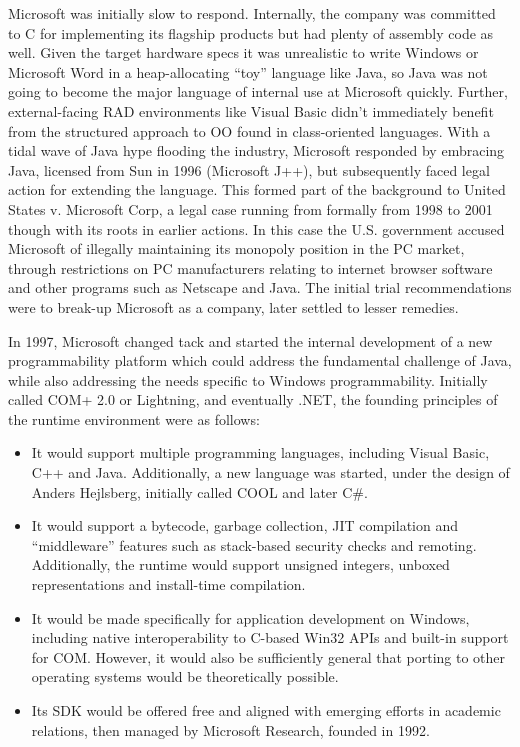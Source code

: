 \documentclass[acmsmall]{acmart}\settopmatter{}
\begin{document}
Microsoft was initially slow to respond.  Internally, the company was committed to C for implementing its
flagship products but had plenty of assembly code as well. Given the target hardware specs it was unrealistic to write
Windows or Microsoft Word in a heap-allocating “toy” language like Java, so Java was not going to become the major
language of internal use at Microsoft quickly. Further, external-facing RAD environments like Visual Basic didn’t immediately
benefit from the structured approach to OO found in class-oriented languages. With a tidal wave of Java hype flooding
the industry, Microsoft responded by embracing Java, licensed from Sun in 1996 (Microsoft J++), but subsequently faced
legal action for extending the language. This formed part of the background to United States v. Microsoft Corp, a legal case
running from formally from 1998 to 2001 though with its roots in earlier actions. In this case the U.S. government accused
Microsoft of illegally maintaining its monopoly position in the PC market, through restrictions on PC manufacturers relating to
internet browser software and other programs such as Netscape and Java. The initial trial recommendations were to break-up Microsoft as a company, later settled to lesser remedies. 

In 1997, Microsoft changed tack and started the internal development of a new programmability platform which could
address the fundamental challenge of Java, while also addressing the needs specific to Windows programmability.  Initially
called COM+ 2.0 or Lightning, and eventually .NET, the founding principles of the runtime environment were as follows:
\begin{itemize}
\item It would support multiple programming languages, including Visual Basic, C++ and Java. Additionally, a new language was started, under the design of Anders Hejlsberg, initially called COOL and later C\#.
\item It would support a bytecode, garbage collection, JIT compilation and “middleware” features such as stack-based security checks and remoting. Additionally, the runtime would support unsigned integers, unboxed representations and install-time compilation.
\item It would be made specifically for application development on Windows, including native interoperability to C-based Win32 APIs and built-in support for COM. However, it would also be sufficiently general that porting to other operating systems would be theoretically possible.
\item Its SDK would be offered free and aligned with emerging efforts in academic relations, then managed by Microsoft Research, founded in 1992.
\end{itemize}
\end{document}
